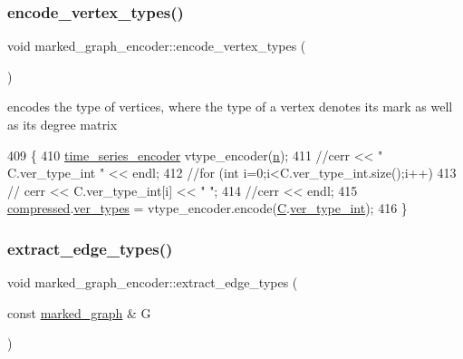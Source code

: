 \subsubsection{\texorpdfstring{encode\+\_\+vertex\+\_\+types()}{encode\_vertex\_types()}}
{\footnotesize\ttfamily void marked\+\_\+graph\+\_\+encoder\+::encode\+\_\+vertex\+\_\+types (\begin{DoxyParamCaption}{ }\end{DoxyParamCaption})\hspace{0.3cm}{\ttfamily [private]}}



encodes the type of vertices, where the type of a vertex denotes its mark as well as its degree matrix 


\begin{DoxyCode}
409 \{
410   \hyperlink{classtime__series__encoder}{time\_series\_encoder} vtype\_encoder(\hyperlink{classmarked__graph__encoder_a4c66d9fdbc14c97523715aac7e4511cb}{n});
411   \textcolor{comment}{//cerr << " C.ver\_type\_int " << endl;}
412   \textcolor{comment}{//for (int i=0;i<C.ver\_type\_int.size();i++)}
413   \textcolor{comment}{//  cerr << C.ver\_type\_int[i] << " ";}
414   \textcolor{comment}{//cerr << endl;}
415   \hyperlink{classmarked__graph__encoder_ac2ded200860fdd2321f86dd76b28bcb3}{compressed}.\hyperlink{classmarked__graph__compressed_af446cc5e23c241a92b76642fd5ebc403}{ver\_types} = vtype\_encoder.encode(\hyperlink{classmarked__graph__encoder_af82bc0653414091291cb75553a407bdb}{C}.\hyperlink{classcolored__graph_a491ed2ea1a65118af02ec606c8d44c0a}{ver\_type\_int});
416 \}
\end{DoxyCode}
\mbox{\label{classmarked__graph__encoder_ac3060e8f7e6abbe371c5968eb47cb8a1}} 
\subsubsection{\texorpdfstring{extract\+\_\+edge\+\_\+types()}{extract\_edge\_types()}}
{\footnotesize\ttfamily void marked\+\_\+graph\+\_\+encoder\+::extract\+\_\+edge\+\_\+types (\begin{DoxyParamCaption}\item[{const \hyperlink{classmarked__graph}{marked\+\_\+graph} \&}]{G }\end{DoxyParamCaption})\hspace{0.3cm}{\ttfamily [private]}}




